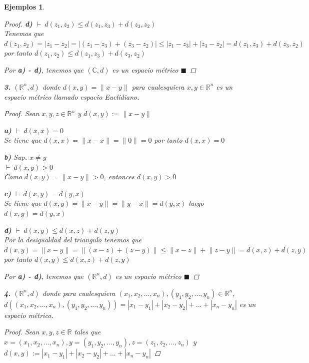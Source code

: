 \documentclass[oneside]{book} %
\theoremstyle{Teorema}
\theoremstyle{Ejemplos}
\newtheorem{Ejemplos}[Definicion]{Ejemplos}
\theoremstyle{[Obs]}
\newcommand{\abs}[1]{\left|#1\right|} %
\newcommand{\norm}[1]{\lVert#1\rVert} %
\renewcommand{\{}{\left\lbrace} %
\renewcommand{\}}{\right\rbrace} %
\newcommand{\R}{\mathbb{R}} %
\newcommand{\C}{\mathbb{C}} %
\newcommand{\Rn}{\mathbb{R}^n} %
\renewcommand{\qed}{$\blacksquare$} %
\newcommand{\pd}{$\vdash\ $} %
\begin{document}
\begin{Ejemplos}
\begin{proof}
					\textbf{d)} \pd $d(z_1, z_2) \leq d(z_1, z_3) + d(z_3, z_2)$ \\
					Tenemos que $d(z_1, z_2) = \abs{z_1 - z_2} = \abs{(z_1 - z_3) + (z_3 - z_2)} \leq \abs{z_1 - z_3} + \abs{z_3 - z_2} = d(z_1, z_3) + d(z_3, z_2)$ por tanto $d(z_1, z_2) \leq d(z_1, z_3) + d(z_3, z_2)$ 

					Por \textbf{a) - d)}, tenemos que $(\C, d)$ es un espacio métrico \qed 

				\end{proof}
				
				\textbf{3.} $(\Rn, d)$ donde $d(x, y) = \norm{x - y}$ para cualesquiera $x, y \in \Rn$ es un espacio métrico llamado espacio Euclidiano. 

				\begin{proof}
					
					Sean $x, y, z \in \Rn$ y $d(x, y) := \norm{x - y}$

					\textbf{a)} \pd $d(x, x) = 0$ \\
					Se tiene que $d(x, x) = \norm{x - x} = \norm{0} = 0$ por tanto $d(x, x) = 0$ 

					\textbf{b)} Sup. $x \neq y$ \\
					\pd $d(x, y) > 0$ \\
					Como $d(x, y) = \norm{x - y} > 0$, entonces $d(x, y) > 0$ 

					\textbf{c)} \pd $d(x, y) = d(y, x)$ \\
					Se tiene que $d(x, y) = \norm{x - y} = \norm{y - x} = d(y, x)$ luego $d(x, y) = d(y, x)$ 

					\textbf{d)} \pd $d(x, y) \leq d(x, z) + d(z, y)$ \\
					Por la desigualdad del triangulo tenemos que $d(x, y) = \norm{x - y} = \norm{(x - z) + (z - y)} \leq \norm{x - z} + \norm{z - y} = d(x, z) + d(z, y)$ por tanto $d(x, y) \leq d(x, z) + d(z, y)$ 

					Por \textbf{a) - d)}, tenemos que $(\Rn, d)$ es un espacio métrico \qed 

				\end{proof}
				
				\textbf{4.} $(\Rn, d)$ donde para cualesquiera $(x_1, x_2, ..., x_n), (y_1, y_2, ..., y_n) \in \Rn$, $d( (x_1, x_2, ..., x_n), (y_1, y_2, ..., y_n) ) = \abs{x_1 - y_1} + \abs{x_2 - y_2} + ... + \abs{x_n - y_n}$ es un espacio métrico. 

				\begin{proof}
					
					Sean $x, y, z \in \R$ tales que $x = (x_1, x_2, ..., x_n), y = (y_1, y_2, ..., y_n), z = (z_1, z_2, ..., z_n)$ y $d(x, y) := \abs{x_1 - y_1} + \abs{x_2 - y_2} + ... + \abs{x_n - y_n}$


\end{proof}
\end{Ejemplos}
\end{document}
